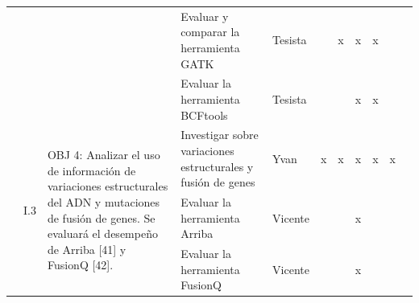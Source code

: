 \documentclass[a4paper,11pt]{article}
\begin{document}
\begin{table}[H]
\begin{tabular}{p{0.6cm}p{0.6cm}p{6cm}p{4cm}p{1cm}cccccc}
		&                       &                                                                                                                                                                                                                                                                                            & Evaluar y comparar la herramienta GATK                                                               & Tesista            &                       & \multicolumn{1}{c}{x}  & x                    & x                    &                       &                        \\
		&                       &                                                                                                                                                                                                                                                                                            & Evaluar la herramienta BCFtools                                                                      & Tesista            &                       &                        & x                    & x                    &                       &                        \\
		& \multirow{4}{*}{I.3}  & \multirow{4}{6cm}{OBJ 4: Analizar el uso de información de variaciones estructurales del ADN y mutaciones de fusión de genes. Se evaluará el desempeño de Arriba [41] y FusionQ [42].}                                                                                            & Investigar sobre variaciones estructurales y fusión de genes                                         & Yvan               & \multicolumn{1}{c}{x} & \multicolumn{1}{c}{x}  & x                    & x                    & \multicolumn{1}{c}{x} &                        \\
		&                       &                                                                                                                                                                                                                                                                                            & Evaluar la herramienta Arriba                                                                        & Vicente            &                       &                        & x                    & \multicolumn{1}{l}{} &                       &                        \\
		&                       &                                                                                                                                                                                                                                                                                            & Evaluar la herramienta FusionQ                                                                       & Vicente            &                       &                        & x                    & \multicolumn{1}{l}{} &                       &                        \\

\end{tabular}
\end{table}
\end{document}

